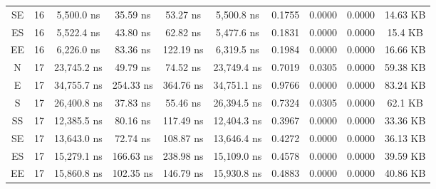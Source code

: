 \begin{sidewaystable}
\begin{tabular}{|c|c|c|c|c|c|c|c|c|c|}
        SE      &   16      &   5,500.0 ns            &   35.59 ns          &   53.27 ns              &   5,500.8 ns            &   0.1755      &   0.0000      &   0.0000      &   14.63 KB         \\
        ES      &   16      &   5,522.4 ns            &   43.80 ns          &   62.82 ns              &   5,477.6 ns            &   0.1831      &   0.0000      &   0.0000      &   15.4 KB          \\
        EE      &   16      &   6,226.0 ns            &   83.36 ns          &   122.19 ns             &   6,319.5 ns            &   0.1984      &   0.0000      &   0.0000      &   16.66 KB         \\
        N       &   17      &   23,745.2 ns           &   49.79 ns          &   74.52 ns              &   23,749.4 ns           &   0.7019      &   0.0305      &   0.0000      &   59.38 KB         \\
        E       &   17      &   34,755.7 ns           &   254.33 ns         &   364.76 ns             &   34,751.1 ns           &   0.9766      &   0.0000      &   0.0000      &   83.24 KB         \\
        S       &   17      &   26,400.8 ns           &   37.83 ns          &   55.46 ns              &   26,394.5 ns           &   0.7324      &   0.0305      &   0.0000      &   62.1 KB          \\
        SS      &   17      &   12,385.5 ns           &   80.16 ns          &   117.49 ns             &   12,404.3 ns           &   0.3967      &   0.0000      &   0.0000      &   33.36 KB         \\
        SE      &   17      &   13,643.0 ns           &   72.74 ns          &   108.87 ns             &   13,646.4 ns           &   0.4272      &   0.0000      &   0.0000      &   36.13 KB         \\
        ES      &   17      &   15,279.1 ns           &   166.63 ns         &   238.98 ns             &   15,109.0 ns           &   0.4578      &   0.0000      &   0.0000      &   39.59 KB         \\
        EE      &   17      &   15,860.8 ns           &   102.35 ns         &   146.79 ns             &   15,930.8 ns           &   0.4883      &   0.0000      &   0.0000      &   40.86 KB         \\
        \hline
    \end{tabular}
\end{sidewaystable}
